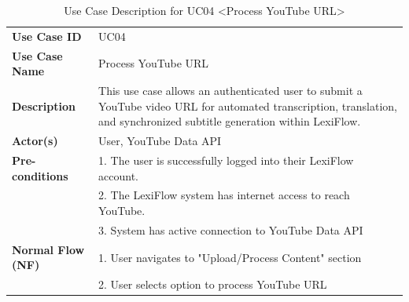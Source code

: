 \documentclass[oneside]{utmthesis}
\begin{document}
\begin{longtable}{|>{\columncolor[HTML]{D9D9D9}}l|p{10cm}|}
    \caption{Use Case Description for UC04 \textless{}Process YouTube URL\textgreater{}}\label{tab:use_case_uc04}
                                                                                        {}                                                                                              \\
    \hline
    \textbf{Use Case ID}           & UC04                                                                                                                                                                     \\
    \hline
    \textbf{Use Case Name}         & Process YouTube URL                                                                                                                                                      \\
    \hline
    \textbf{Description}           & This use case allows an authenticated user to submit a YouTube video URL for automated transcription, translation, and synchronized subtitle generation within LexiFlow. \\
    \hline
    \textbf{Actor(s)}              & User, YouTube Data API                                                                                                                                                   \\
    \hline
    \textbf{Pre-conditions}        &
    1. The user is successfully logged into their LexiFlow account.                                                                                                                                           \\
                                   & 2. The LexiFlow system has internet access to reach YouTube.                                                                                                             \\
                                   & 3. System has active connection to YouTube Data API                                                                                                                      \\
    \hline
    \textbf{Normal Flow (NF)}      &
    1. User navigates to "Upload/Process Content" section                                                                                                                                                     \\
                                   & 2. User selects option to process YouTube URL                                                                                                                            \\

\end{longtable}
\end{document}
